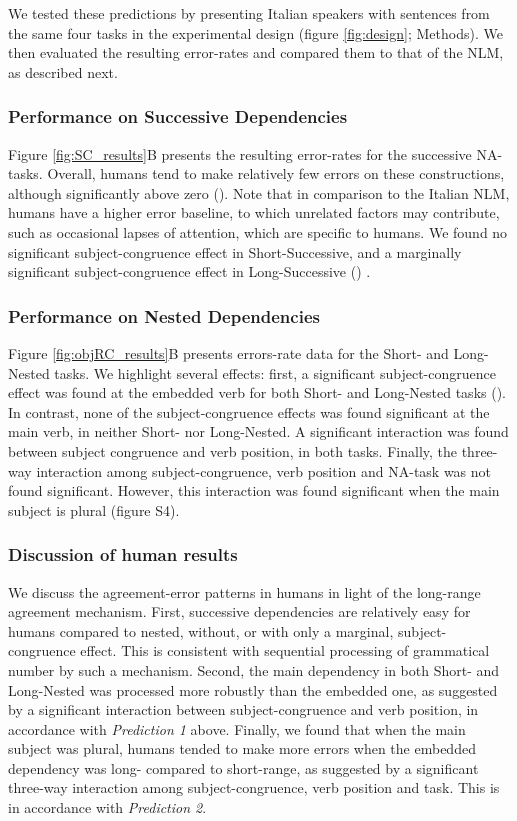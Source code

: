 We tested these predictions by presenting Italian speakers with sentences from the same four tasks in the experimental design (figure \ref{fig:design}; Methods). We then evaluated the resulting error-rates and compared them to that of the NLM, as described next. 

\subsubsection{Performance on Successive Dependencies}
Figure \ref{fig:SC_results}B presents the resulting error-rates for the successive NA-tasks. Overall, humans tend to make relatively few errors on these constructions, although significantly above zero (). Note that in comparison to the Italian NLM, humans have a higher error baseline, to which unrelated factors may contribute, such as occasional lapses of attention, which are specific to humans. We found no significant subject-congruence effect in Short-Successive, and a marginally significant subject-congruence effect in Long-Successive () .

\subsubsection{Performance on Nested Dependencies}
Figure \ref{fig:objRC_results}B presents errors-rate data for the Short- and Long-Nested tasks. We highlight several effects: first, a significant subject-congruence effect was found at the embedded verb for both Short- and Long-Nested tasks (). In contrast, none of the subject-congruence effects was found significant at the main verb, in neither Short- nor Long-Nested. A significant interaction was found between subject congruence and verb position, in both tasks. Finally, the three-way interaction among subject-congruence, verb position and NA-task was not found significant. However, this interaction was found significant when the main subject is plural (figure S4). 

\subsubsection{Discussion of human results}
We discuss the agreement-error patterns in humans in light of the long-range agreement mechanism. First, successive dependencies are relatively easy for humans compared to nested, without, or with only a marginal, subject-congruence effect. This is consistent with sequential processing of grammatical number by such a mechanism. Second, the main dependency in both Short- and Long-Nested was processed more robustly than the embedded one, as suggested by a significant interaction between subject-congruence and verb position, in accordance with \textit{Prediction 1} above. Finally, we found that when the main subject was plural, humans tended to make more errors when the embedded dependency was long- compared to short-range, as suggested by a significant three-way interaction among subject-congruence, verb position and task. This is in accordance with \textit{Prediction 2}. 


